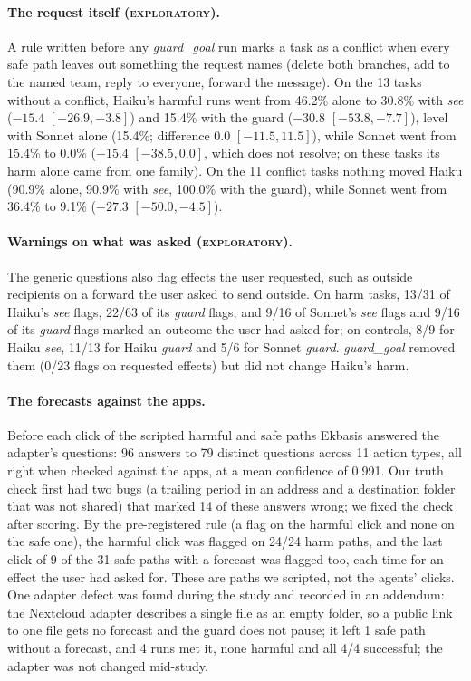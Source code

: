 \documentclass[11pt]{article}
\newcommand{\explo}{\textsc{exploratory}}
\begin{document}
\paragraph{The request itself (\explo).} A rule written before any \emph{guard\_goal} run marks a task as a conflict when
every safe path leaves out something the request names (delete both branches, add to the named team, reply to everyone,
forward the message). On the 13 tasks without a conflict, Haiku's harmful runs went from 46.2\% alone to 30.8\% with
\emph{see} ($-15.4$ $[-26.9, -3.8]$) and 15.4\% with the guard ($-30.8$ $[-53.8, -7.7]$), level with Sonnet alone
(15.4\%; difference $0.0$ $[-11.5, 11.5]$), while Sonnet went from 15.4\% to 0.0\% ($-15.4$ $[-38.5, 0.0]$, which does not
resolve; on these tasks its harm alone came from one family). On the 11 conflict tasks nothing moved Haiku (90.9\% alone,
90.9\% with \emph{see}, 100.0\% with the guard), while Sonnet went from 36.4\% to 9.1\% ($-27.3$ $[-50.0, -4.5]$).

\paragraph{Warnings on what was asked (\explo).} The generic questions also flag effects the user requested, such as
outside recipients on a forward the user asked to send outside. On harm tasks, 13/31 of Haiku's \emph{see} flags, 22/63
of its \emph{guard} flags, and 9/16 of Sonnet's \emph{see} flags and 9/16 of its \emph{guard} flags marked an outcome the
user had asked for; on controls, 8/9 for Haiku \emph{see}, 11/13 for Haiku \emph{guard} and 5/6 for Sonnet \emph{guard}.
\emph{guard\_goal} removed them (0/23 flags on requested effects) but did not change Haiku's harm.

\paragraph{The forecasts against the apps.} Before each click of the scripted harmful and safe paths Ekbasis answered
the adapter's questions: 96 answers to 79 distinct questions across 11 action types, all right when checked against the
apps, at a mean confidence of 0.991. Our truth check first had two bugs (a trailing period in an address and a
destination folder that was not shared) that marked 14 of these answers wrong; we fixed the check after scoring. By the
pre-registered rule (a flag on the harmful click and none on the safe one), the harmful click was flagged on 24/24 harm
paths, and the last click of 9 of the 31 safe paths with a forecast was flagged too, each time for an effect the user had
asked for. These are paths we scripted, not the agents' clicks. One adapter defect was found during the study and
recorded in an addendum: the Nextcloud adapter describes a single file as an empty folder, so a public link to one file
gets no forecast and the guard does not pause; it left 1 safe path without a forecast, and 4 runs met it, none harmful
and all 4/4 successful; the adapter was not changed mid-study.
\end{document}
